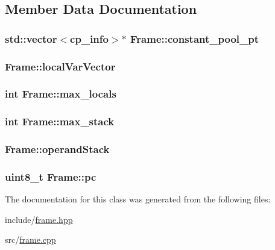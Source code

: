 \subsection{Member Data Documentation}
\hypertarget{classFrame_ad26c914060a8faccf9c2231e6ad6a6e1}{
\subsubsection[{constant\+\_\+pool\+\_\+pt}]{\setlength{\rightskip}{0pt plus 5cm}std\+::vector$<${\bf cp\+\_\+info}$>$$\ast$ Frame\+::constant\+\_\+pool\+\_\+pt}}\label{classFrame_ad26c914060a8faccf9c2231e6ad6a6e1}
\hypertarget{classFrame_a772f081938798fd4553c7d3300a959fb}{
\subsubsection[{local\+Var\+Vector}]{ Frame\+::local\+Var\+Vector}}\label{classFrame_a772f081938798fd4553c7d3300a959fb}
\hypertarget{classFrame_a1bcd26b0c048fa4ce6c00c28943d752f}{
\subsubsection[{max\+\_\+locals}]{\setlength{\rightskip}{0pt plus 5cm}int Frame\+::max\+\_\+locals}}\label{classFrame_a1bcd26b0c048fa4ce6c00c28943d752f}
\hypertarget{classFrame_a2096ad8a85ebe1c025f9e18a5cc632b9}{
\subsubsection[{max\+\_\+stack}]{\setlength{\rightskip}{0pt plus 5cm}int Frame\+::max\+\_\+stack}}\label{classFrame_a2096ad8a85ebe1c025f9e18a5cc632b9}
\hypertarget{classFrame_a9d027e28d71e647569324633e35c0c48}{
\subsubsection[{operand\+Stack}]{ Frame\+::operand\+Stack}}\label{classFrame_a9d027e28d71e647569324633e35c0c48}
\hypertarget{classFrame_a7df6af31d1f082ce39f496e1db61c1de}{
\subsubsection[{pc}]{\setlength{\rightskip}{0pt plus 5cm}uint8\+\_\+t Frame\+::pc}}\label{classFrame_a7df6af31d1f082ce39f496e1db61c1de}


The documentation for this class was generated from the following files\+:\begin{DoxyCompactItemize}
\item 
include/\hyperlink{frame_8hpp}{frame.\+hpp}\item 
src/\hyperlink{frame_8cpp}{frame.\+cpp}\end{DoxyCompactItemize}

